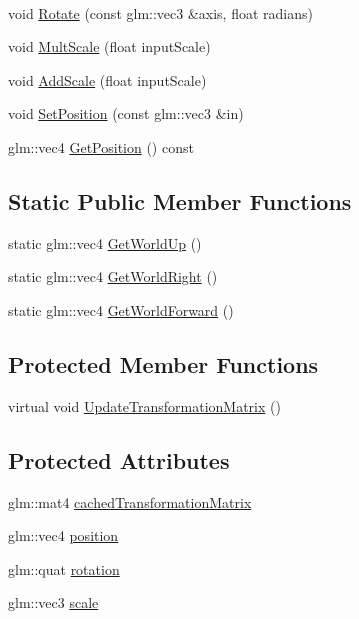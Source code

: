 \begin{DoxyCompactItemize}
$$\item 
void \hyperlink{class_scene_object_a0d27f5853e8e1718b1a77f0f1a6d4551}{Rotate} (const glm\+::vec3 \&axis, float radians)
\item 
void \hyperlink{class_scene_object_a00d73ad3f7d77bfc0d3c1869decb97ea}{Mult\+Scale} (float input\+Scale)
\item 
void \hyperlink{class_scene_object_a40d7194cf79cad6ee3a2fa7c3d8ed95c}{Add\+Scale} (float input\+Scale)
\item 
void \hyperlink{class_scene_object_a1903672e77e88a1e220fcfa8e6afc1d4}{Set\+Position} (const glm\+::vec3 \&in)
\item 
glm\+::vec4 \hyperlink{class_scene_object_ac52870b92ce4cebdd153d44754d1ca7c}{Get\+Position} () const 
\end{DoxyCompactItemize}
\subsection*{Static Public Member Functions}
\begin{DoxyCompactItemize}
\item 
static glm\+::vec4 \hyperlink{class_scene_object_a334a5fb4e91d85fe6a046bd83dd235d3}{Get\+World\+Up} ()
\item 
static glm\+::vec4 \hyperlink{class_scene_object_a46d0ffed082f7bd515b9550ef9f9a86a}{Get\+World\+Right} ()
\item 
static glm\+::vec4 \hyperlink{class_scene_object_a6fa71efda895933be4ee684745980e68}{Get\+World\+Forward} ()
\end{DoxyCompactItemize}
\subsection*{Protected Member Functions}
\begin{DoxyCompactItemize}
\item 
virtual void \hyperlink{class_scene_object_a20e31da3f9d2765de50cdb2d637ae6c9}{Update\+Transformation\+Matrix} ()
\end{DoxyCompactItemize}
\subsection*{Protected Attributes}
\begin{DoxyCompactItemize}
\item 
glm\+::mat4 \hyperlink{class_scene_object_aac3f13eea8a7b455e8cffc6eceef211c}{cached\+Transformation\+Matrix}
\item 
glm\+::vec4 \hyperlink{class_scene_object_ab4aa9bed778001970c38ea11ef34b285}{position}
\item 
glm\+::quat \hyperlink{class_scene_object_ae27376aaca87543a75b5a2cd0daf6e2f}{rotation}
\item 
glm\+::vec3 \hyperlink{class_scene_object_a62c686b880fe4f58dec64a409e56de26}{scale}
\end{DoxyCompactItemize}
